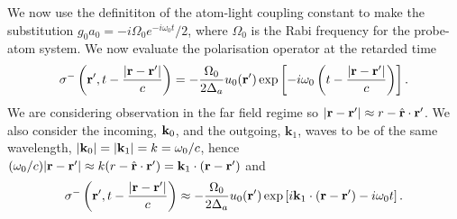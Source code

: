 We now use the definititon of the atom-light coupling constant
\cite{Scully} to make the substitution
$g_0 a_0 = -i \Omega_0 e^{-i \omega_0 t} / 2$, where
$\Omega_0$ is the Rabi frequency for the probe-atom system. We now
evaluate the polarisation operator at the retarded time
\begin{equation}
  \sigma^- \left(\mathbf{r}^\prime, t - \frac{|\mathbf{r} - \mathbf{r}^\prime|}{c} \right) =
  -\frac{\Omega_0}{2 \Delta_a} u_0 (\mathbf{r}^\prime) \exp \left[-i \omega_0
    \left( t - \frac{|\mathbf{r} - \mathbf{r}^\prime|}{c} \right)\right].
\end{equation}
We are considering observation in the far field regime so
$|\mathbf{r} - \mathbf{r}^\prime| \approx r - \hat{\mathbf{r}} \cdot
\mathbf{r}^\prime$. We also consider the incoming, $\mathbf{k}_0$, and the
outgoing, $\mathbf{k}_1$, waves to be of the same wavelength,
$|\mathbf{k}_0| = |\mathbf{k}_1| = k = \omega_0 / c$, hence
$(\omega_0 / c) |\mathbf{r} - \mathbf{r}^\prime| \approx k (r - \hat{\mathbf{r}}
\cdot \mathbf{r}^\prime) = \mathbf{k}_1 \cdot (\mathbf{r} - \mathbf{r}^\prime )$ and
\begin{equation}
  \sigma^- \left(\mathbf{r}^\prime, t - \frac{|\mathbf{r} - \mathbf{r}^\prime|}{c} \right) \approx
  -\frac{\Omega_0}{2 \Delta_a} u_0 (\mathbf{r}^\prime) \exp \left[i
    \mathbf{k}_1 \cdot (\mathbf{r} - \mathbf{r}^\prime ) - i \omega_0 t \right].
\end{equation}

